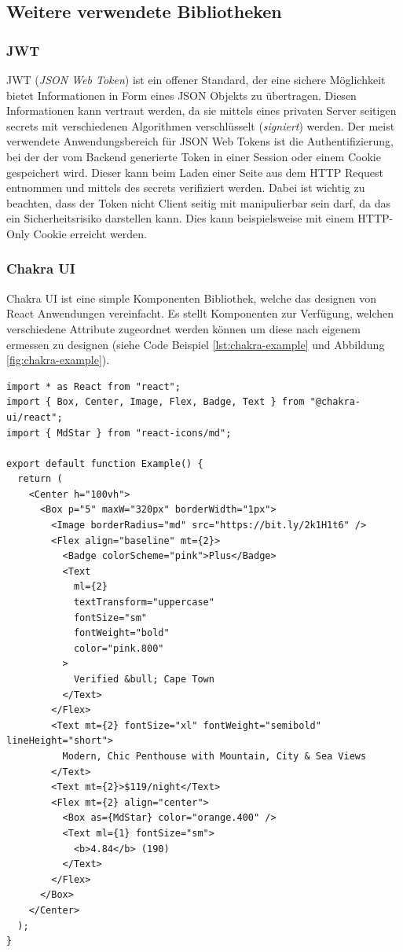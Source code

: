 \documentclass[a4paper,12pt]{report}
\newcommand{\footcite}[1]{\footnotemark\footnotetext{\cite{#1}}}
\begin{document}
        \subsection{Weitere verwendete Bibliotheken}
        \subsubsection{JWT}
JWT (\textit{JSON Web Token}) ist ein offener Standard, der eine sichere Möglichkeit bietet Informationen in Form eines JSON Objekts zu übertragen\footcite{JWT}. Diesen Informationen kann vertraut werden, da sie mittels eines privaten Server seitigen secrets mit verschiedenen Algorithmen  verschlüsselt (\textit{signiert}) werden. Der meist verwendete Anwendungsbereich für JSON Web Tokens ist die Authentifizierung, bei der der vom Backend generierte Token in einer Session oder einem Cookie gespeichert wird. Dieser kann beim Laden einer Seite aus dem HTTP Request entnommen und mittels des secrets verifiziert werden. Dabei ist wichtig zu beachten, dass der Token nicht Client seitig mit manipulierbar sein darf, da das ein Sicherheitsrisiko darstellen kann. Dies kann beispielsweise mit einem HTTP-Only Cookie\footcite{Http-only} erreicht werden.
 
        \subsubsection{Chakra UI}
Chakra UI ist eine simple Komponenten Bibliothek, welche das designen von React Anwendungen vereinfacht\footcite{chakraui}. Es stellt Komponenten zur Verfügung, welchen verschiedene Attribute zugeordnet werden können um diese nach eigenem ermessen zu designen (siehe Code Beispiel \ref{lst:chakra-example} und Abbildung \ref{fig:chakra-example}).

\begin{lstlisting}[style=codeStyle, caption={Beispiel mit Chakra UI designten React Komponente (siehe Abbildung  \textbf{Quelle: } \cite{chakraui}}, label={lst:chakra-example}]
import * as React from "react";
import { Box, Center, Image, Flex, Badge, Text } from "@chakra-ui/react";
import { MdStar } from "react-icons/md";

export default function Example() {
  return (
    <Center h="100vh">
      <Box p="5" maxW="320px" borderWidth="1px">
        <Image borderRadius="md" src="https://bit.ly/2k1H1t6" />
        <Flex align="baseline" mt={2}>
          <Badge colorScheme="pink">Plus</Badge>
          <Text
            ml={2}
            textTransform="uppercase"
            fontSize="sm"
            fontWeight="bold"
            color="pink.800"
          >
            Verified &bull; Cape Town
          </Text>
        </Flex>
        <Text mt={2} fontSize="xl" fontWeight="semibold" lineHeight="short">
          Modern, Chic Penthouse with Mountain, City & Sea Views
        </Text>
        <Text mt={2}>$119/night</Text>
        <Flex mt={2} align="center">
          <Box as={MdStar} color="orange.400" />
          <Text ml={1} fontSize="sm">
            <b>4.84</b> (190)
          </Text>
        </Flex>
      </Box>
    </Center>
  );
}
\end{lstlisting}
\end{document}
